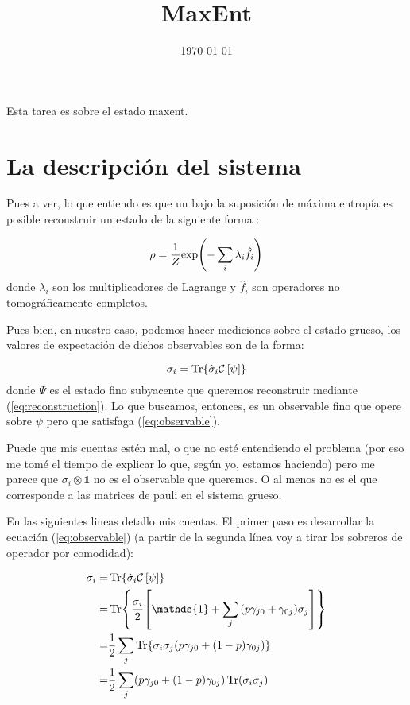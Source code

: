 \documentclass[onecolumn,11pt]{article}
\title{MaxEnt}
\date{\today}
\newcommand{\mcC}{\mathcal{C}}
\newcommand{\Id}{\mathds{1}}%
\newcommand{\CG}[1]{\mcC\left[#1\right]}
\begin{document}
\maketitle
\thispagestyle{empty}
Esta tarea es sobre el estado maxent.
\section{La descripción del sistema}

Pues a ver, lo que entiendo es que un bajo la suposición de máxima entropía es posible reconstruir un estado de la siguiente forma \cite{MaxEnt}:

\begin{equation}\label{eq:reconstruction}
\rho=\frac{1}{Z}\text{exp}\qty(-\sum_{i}\lambda_{i}\hat{f}_{i})
\end{equation}
donde $\lambda_{i}$ son los multiplicadores de Lagrange y $\hat{f}_{i}$ son operadores no tomográficamente completos.

\vspace{0.2cm}

Pues bien, en nuestro caso, podemos hacer mediciones sobre el estado grueso, los valores de expectación de dichos observables son de la forma:

\begin{equation}\label{eq:observable}
\sigma_{i}=\Tr{\hat{\sigma}_{i}\CG{\psi}}
\end{equation}
donde $\Psi$ es el estado fino subyacente que queremos reconstruir mediante (\ref{eq:reconstruction}). Lo que buscamos, entonces, es un observable fino que opere sobre $\psi$ pero que satisfaga (\ref{eq:observable}).

\vspace{0.2cm}


Puede que mis cuentas estén mal, o que no esté entendiendo el problema (por eso me tomé el tiempo de explicar lo que, según yo, estamos haciendo) pero me parece que $\sigma_{i}\otimes\Id$ no es el observable que queremos. O al menos no es el que corresponde a las matrices de pauli en el sistema grueso.

\vspace{0.2cm}


En las siguientes lineas detallo mis cuentas. El primer paso es desarrollar la ecuación (\ref{eq:observable}) (a partir de la segunda línea voy a tirar los sobreros de operador por comodidad):

\begin{align*}
\sigma_{i}=&\Tr{\hat{\sigma}_{i}\CG{\psi}}\\
=&\Tr{\frac{\sigma_{i}}{2}\qty[\Id+\sum_{j}\qty(p\gamma_{j0}+\gamma_{0j})\sigma_{j}]}\\
=&\frac{1}{2}\sum_{j}\Tr{\sigma_{i}\sigma_{j}(p\gamma_{j0}+(1-p)\gamma_{0j})}\\
=&\frac{1}{2}\sum_{j}(p\gamma_{j0}+(1-p)\gamma_{0j})\Tr(\sigma_{i}\sigma_{j})
\end{align*}
\end{document}
